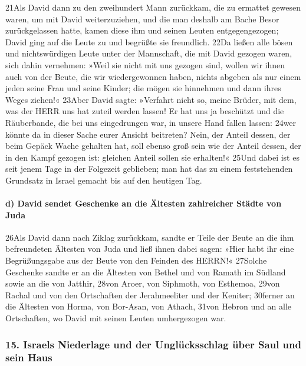 21Als David dann zu den zweihundert Mann zurückkam, die zu ermattet
gewesen waren, um mit David weiterzuziehen, und die man deshalb am Bache
Besor zurückgelassen hatte, kamen diese ihm und seinen Leuten
entgegengezogen; David ging auf die Leute zu und begrüßte sie
freundlich. 22Da ließen alle bösen und nichtswürdigen Leute unter der
Mannschaft, die mit David gezogen waren, sich dahin vernehmen: »Weil sie
nicht mit uns gezogen sind, wollen wir ihnen auch von der Beute, die wir
wiedergewonnen haben, nichts abgeben als nur einem jeden seine Frau und
seine Kinder; die mögen sie hinnehmen und dann ihres Weges ziehen!«
23Aber David sagte: »Verfahrt nicht so, meine Brüder, mit dem, was der
HERR uns hat zuteil werden lassen! Er hat uns ja beschützt und die
Räuberbande, die bei uns eingedrungen war, in unsere Hand fallen lassen:
24wer könnte da in dieser Sache eurer Ansicht beitreten? Nein, der
Anteil dessen, der beim Gepäck Wache gehalten hat, soll ebenso groß sein
wie der Anteil dessen, der in den Kampf gezogen ist: gleichen Anteil
sollen sie erhalten!« 25Und dabei ist es seit jenem Tage in der
Folgezeit geblieben; man hat das zu einem feststehenden Grundsatz in
Israel gemacht bis auf den heutigen Tag.

\hypertarget{d-david-sendet-geschenke-an-die-uxe4ltesten-zahlreicher-stuxe4dte-von-juda}{%
\paragraph{d) David sendet Geschenke an die Ältesten zahlreicher Städte
von
Juda}\label{d-david-sendet-geschenke-an-die-uxe4ltesten-zahlreicher-stuxe4dte-von-juda}}

26Als David dann nach Ziklag zurückkam, sandte er Teile der Beute an die
ihm befreundeten Ältesten von Juda und ließ ihnen dabei sagen: »Hier
habt ihr eine Begrüßungsgabe aus der Beute von den Feinden des HERRN!«
27Solche Geschenke sandte er an die Ältesten von Bethel und von Ramath
im Südland sowie an die von Jatthir, 28von Aroer, von Siphmoth, von
Esthemoa, 29von Rachal und von den Ortschaften der Jerahmeeliter und der
Keniter; 30ferner an die Ältesten von Horma, von Bor-Asan, von Athach,
31von Hebron und an alle Ortschaften, wo David mit seinen Leuten
umhergezogen war.

\hypertarget{israels-niederlage-und-der-ungluxfccksschlag-uxfcber-saul-und-sein-haus}{%
\subsubsection{15. Israels Niederlage und der Unglücksschlag über Saul
und sein
Haus}\label{israels-niederlage-und-der-ungluxfccksschlag-uxfcber-saul-und-sein-haus}}

